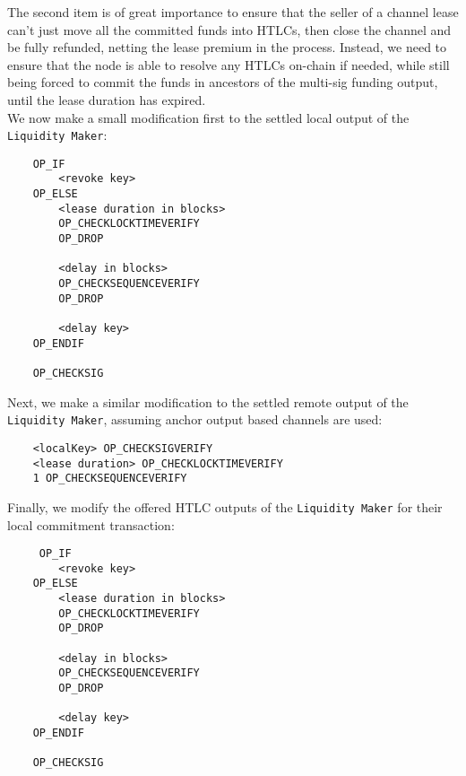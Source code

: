 \documentclass[10pt,a4paper]{article}
\theoremstyle{definition}
\begin{document}
The second item is of great importance to ensure that the seller of a channel
lease can't just move all the committed funds into HTLCs, then close the
channel and be fully refunded, netting the lease premium in the process.
Instead, we need to ensure that the node is able to resolve any HTLCs on-chain
if needed, while still being forced to commit the funds in ancestors of the
multi-sig funding output, until the lease duration has expired. \\

We now make a small modification first to the settled local output of the
\texttt{Liquidity Maker}:
\begin{center}
    \begin{verbatim}
    OP_IF
        <revoke key> 
    OP_ELSE
        <lease duration in blocks>
        OP_CHECKLOCKTIMEVERIFY
        OP_DROP
     
        <delay in blocks>
        OP_CHECKSEQUENCEVERIFY
        OP_DROP
        
        <delay key> 
    OP_ENDIF

    OP_CHECKSIG
    \end{verbatim} 
\end{center}

Next, we make a similar modification to the settled remote output of the
\texttt{Liquidity Maker}, assuming anchor output based channels
\cite{anchorChans} are used: 
\begin{center}
    \begin{verbatim}
    <localKey> OP_CHECKSIGVERIFY
    <lease duration> OP_CHECKLOCKTIMEVERIFY
    1 OP_CHECKSEQUENCEVERIFY
    \end{verbatim} 
\end{center}

Finally, we modify the offered HTLC outputs of the \texttt{Liquidity Maker} for
their local commitment transaction:
\begin{center}
    \begin{verbatim}
     OP_IF
        <revoke key> 
    OP_ELSE
        <lease duration in blocks>
        OP_CHECKLOCKTIMEVERIFY
        OP_DROP
     
        <delay in blocks>
        OP_CHECKSEQUENCEVERIFY
        OP_DROP
        
        <delay key> 
    OP_ENDIF

    OP_CHECKSIG
    \end{verbatim} 
\end{center}

\end{document}
